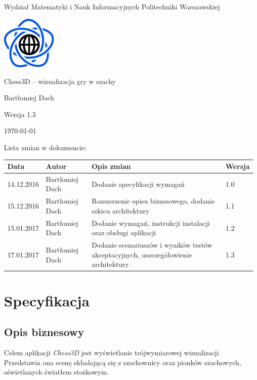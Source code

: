 \documentclass[10pt,a4paper]{article}
\begin{document}
\begin{titlepage}
	\centering
	{\Large Wydział Matematyki i Nauk Informacyjnych Politechniki Warszawskiej \par}
	\vspace{1cm}
	\includegraphics[width=0.2\textwidth]{logo.png} \par
	\vspace{5cm}
	{\LARGE Chess3D -- wizualizacja gry w szachy \par}
	\vspace{0.5cm}
	{\Large Bartłomiej Dach \par}
	\vspace{1.5cm}
	{\Large Wersja 1.3 \par}
	\vspace{1.5cm}
	{\Large \today \par}
\end{titlepage}
Lista zmian w dokumencie:
\begin{table}[H]
\def\arraystretch{1.5}
\begin{tabularx}{\textwidth}{|l|l|X|l|}
	\hline
	\textbf{Data} & \textbf{Autor} & \textbf{Opis zmian} & \textbf{Wersja} \\
	\hline
	14.12.2016 & Bartłomiej Dach & Dodanie specyfikacji wymagań & 1.0 \\
	\hline
	15.12.2016 & Bartłomiej Dach & Rozszerzenie opisu biznesowego, dodanie szkicu architektury & 1.1 \\
	\hline
	15.01.2017 & Bartłomiej Dach & Dodanie wymagań, instrukcji instalacji oraz obsługi aplikacji & 1.2 \\
	\hline
	17.01.2017 & Bartłomiej Dach & Dodanie scenariuszów i wyników testów akceptacyjnych, uszczegółowienie architektury & 1.3 \\
	\hline
\end{tabularx}
\end{table}

\tableofcontents
\newpage

\section{Specyfikacja}

\subsection{Opis biznesowy}
Celem aplikacji \emph{Chess3D} jest wyświetlanie trójwymiarowej wizualizacji. Przedstawia ona scenę składającą się z szachownicy oraz pionków szachowych, oświetlanych światłem stożkowym.
\end{document}

